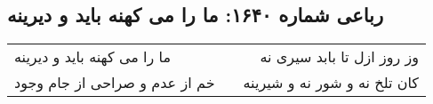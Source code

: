 \begin{center}
\section*{رباعی شماره ۱۶۴۰: ما را می کهنه باید و دیرینه}
\label{sec:1640}
\begin{longtable}{l p{0.5cm} r}
ما را می کهنه باید و دیرینه
&&
وز روز ازل تا بابد سیری نه
\\
خم از عدم و صراحی از جام وجود
&&
کان تلخ نه و شور نه و شیرینه
\\
\end{longtable}
\end{center}
